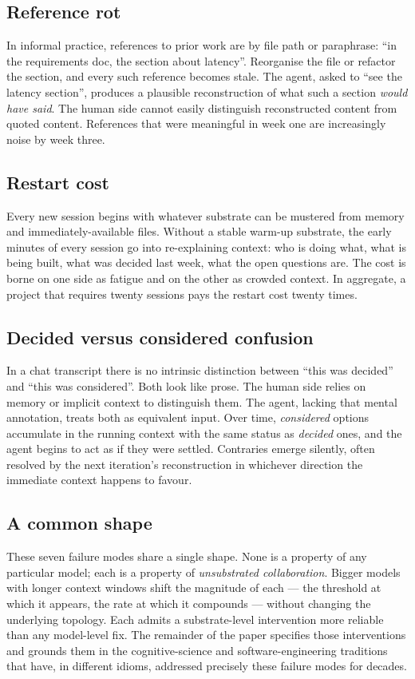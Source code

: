 \documentclass[11pt,a4paper,twocolumn]{article}
\begin{document}
\subsection{Reference rot}
In informal practice, references to prior work are by file path or
paraphrase: ``in the requirements doc, the section about latency''.
Reorganise the file or refactor the section, and every such
reference becomes stale. The agent, asked to ``see the latency
section'', produces a plausible reconstruction of what such a
section \emph{would have said}. The human side cannot easily
distinguish reconstructed content from quoted content. References
that were meaningful in week one are increasingly noise by week
three.

\subsection{Restart cost}
Every new session begins with whatever substrate can be mustered
from memory and immediately-available files. Without a stable
warm-up substrate, the early minutes of every session go into
re-explaining context: who is doing what, what is being built,
what was decided last week, what the open questions are. The cost
is borne on one side as fatigue and on the other as crowded
context. In aggregate, a project that requires twenty sessions
pays the restart cost twenty times.

\subsection{Decided versus considered confusion}
In a chat transcript there is no intrinsic distinction between
``this was decided'' and ``this was considered''. Both look like
prose. The human side relies on memory or implicit context to
distinguish them. The agent, lacking that mental annotation, treats
both as equivalent input. Over time, \emph{considered} options
accumulate in the running context with the same status as
\emph{decided} ones, and the agent begins to act as if they were
settled. Contraries emerge silently, often resolved by the next
iteration's reconstruction in whichever direction the immediate
context happens to favour.

\subsection*{A common shape}
These seven failure modes share a single shape. None is a property
of any particular model; each is a property of \emph{unsubstrated
collaboration}. Bigger models with longer context windows shift
the magnitude of each --- the threshold at which it appears, the
rate at which it compounds --- without changing the underlying
topology. Each admits a substrate-level intervention more reliable
than any model-level fix. The remainder of the paper specifies
those interventions and grounds them in the cognitive-science and
software-engineering traditions that have, in different idioms,
addressed precisely these failure modes for decades.
\end{document}
